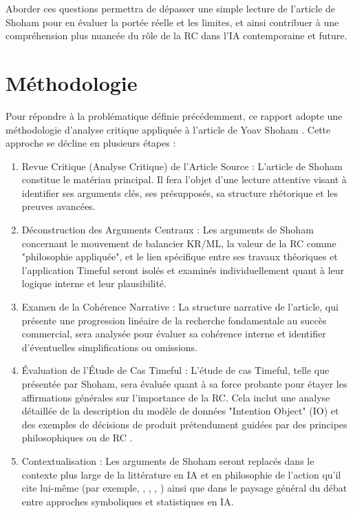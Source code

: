 \documentclass[11pt,a4paper]{article}
\begin{document}
Aborder ces questions permettra de dépasser une simple lecture de l'article de Shoham pour en évaluer la portée réelle et les limites, et ainsi contribuer à une compréhension plus nuancée du rôle de la RC dans l'IA contemporaine et future.

\section{Méthodologie}
\label{sec:methodologie}
Pour répondre à la problématique définie précédemment, ce rapport adopte une méthodologie d'analyse critique appliquée à l'article de Yoav Shoham \citep{Shoham2015Why}. Cette approche se décline en plusieurs étapes :

\begin{enumerate}
    \item {Revue Critique (Analyse Critique) de l'Article Source :} L'article de Shoham \citep{Shoham2015Why} constitue le matériau principal. Il fera l'objet d'une lecture attentive visant à identifier ses arguments clés, ses présupposés, sa structure rhétorique et les preuves avancées.

    \item {Déconstruction des Arguments Centraux :} Les arguments de Shoham concernant le mouvement de balancier KR/ML, la valeur de la RC comme "philosophie appliquée", et le lien spécifique entre ses travaux théoriques \citep{Shoham2009Logics} et l'application Timeful seront isolés et examinés individuellement quant à leur logique interne et leur plausibilité.

    \item {Examen de la Cohérence Narrative :} La structure narrative de l'article, qui présente une progression linéaire de la recherche fondamentale au succès commercial, sera analysée pour évaluer sa cohérence interne et identifier d'éventuelles simplifications ou omissions.

    \item {Évaluation de l'Étude de Cas Timeful :} L'étude de cas Timeful, telle que présentée par Shoham, sera évaluée quant à sa force probante pour étayer les affirmations générales sur l'importance de la RC. Cela inclut une analyse détaillée de la description du modèle de données "Intention Object" (IO) et des exemples de décisions de produit prétendument guidées par des principes philosophiques ou de RC \citep{Shoham2015Why}.

    \item {Contextualisation :} Les arguments de Shoham seront replacés dans le contexte plus large de la littérature en IA et en philosophie de l'action qu'il cite lui-même (par exemple, \citet{Cohen1990Intention}, \citet{Bratman1991Intentions}, \citet{AlchourronGardenforsMakinson1985}, \citet{Icard2023Joint}) ainsi que dans le paysage général du débat entre approches symboliques et statistiques en IA.


\end{enumerate}
\end{document}
